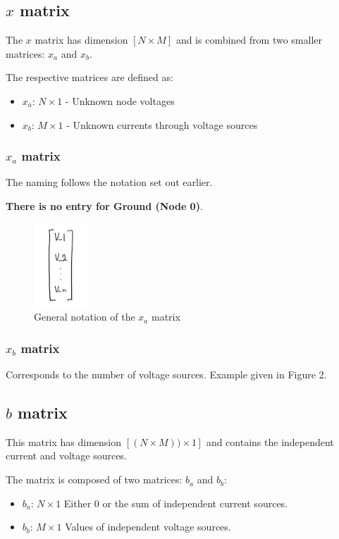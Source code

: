 \documentclass[a4paper, titlepage]{article}
\begin{document}
    \subsection{$x$ matrix}
    The $x$ matrix has dimension $[N \times M]$ and is combined from two smaller matrices: $x_a$ and $x_b$. 
    \par
    The respective matrices are defined as:
    \begin{itemize}
        \item $x_a$: $N \times 1$ - Unknown node voltages
        \item $x_b$: $M \times 1$ - Unknown currents through voltage sources
    \end{itemize}
    \subsubsection{$x_a$ matrix}
    The naming follows the notation set out earlier. \par 
    \textbf{There is no entry for Ground (Node 0)}.
    \begin{figure}[htp]
        \centering
        \includegraphics[width=20mm,scale=0.25]{Matrix4}
        \caption{General notation of the $x_a$ matrix}
        \label{fig:figure3}
    \end{figure}
    \subsubsection{$x_b$ matrix}
    Corresponds to the number of voltage sources. Example given in Figure 2.
    \subsection{$b$ matrix}
    This matrix has dimension $[(N \times M)) \times 1]$ and contains the independent current and voltage sources.
    
    The matrix is composed of two matrices: $b_a$ and $b_b$:
    \begin{itemize}
        \item $b_a$: $N \times 1$ Either 0 or the sum of independent current sources.
        \item $b_b$: $M \times 1$ Values of independent voltage sources.
    \end{itemize}
    \pagebreak
\end{document}
